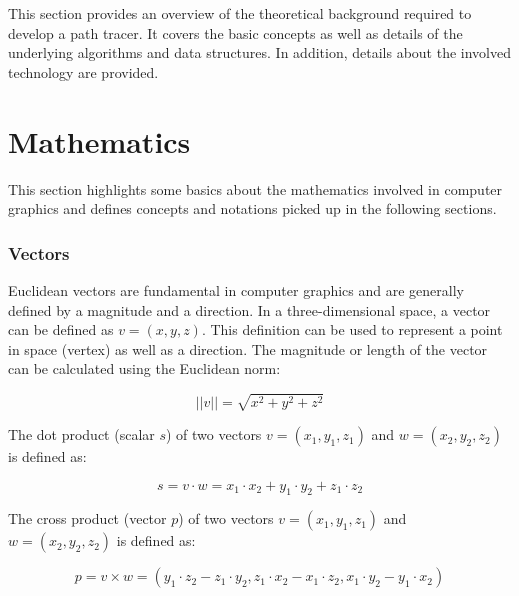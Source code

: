 \label{ch:theory}

This section provides an overview of the theoretical background required to develop a path tracer. It covers the basic concepts as well as details of the underlying algorithms and data structures. In addition, details about the involved technology are provided.

\section{Mathematics}

This section highlights some basics about the mathematics involved in computer graphics and defines concepts and notations picked up in the following sections.

\subsubsection{Vectors}

Euclidean vectors are fundamental in computer graphics and are generally defined by a magnitude and a direction. In a three-dimensional space, a vector can be defined as $v = (x, y, z)$. This definition can be used to represent a point in space (vertex) as well as a direction. The magnitude or length of the vector can be calculated using the Euclidean norm:

\begin{equation}
  \label{eqn:euclidean-norm}
  ||v|| = \sqrt{x^2 + y^2 + z^2}
\end{equation}

The dot product (scalar $s$) of two vectors $v = (x_1, y_1, z_1)$ and $w = (x_2, y_2, z_2)$ is defined as:

\begin{equation}
  \label{eqn:dot-product}
  s = v \cdot w = x_1 \cdot x_2 + y_1 \cdot y_2 + z_1 \cdot z_2
\end{equation}

The cross product (vector $p$) of two vectors $v = (x_1, y_1, z_1)$ and $w = (x_2, y_2, z_2)$ is defined as:

\begin{equation}
  \label{eqn:cross-product}
  p = v \times w = (y_1 \cdot z_2 - z_1 \cdot y_2, z_1 \cdot x_2 - x_1 \cdot z_2, x_1 \cdot y_2 - y_1 \cdot x_2)
\end{equation}

